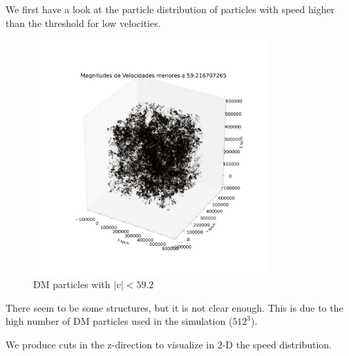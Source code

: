 \documentclass[12pt]{article}
\begin{document}
We first have a look at the particle distribution of particles with speed higher than the
threshold for low velocities.\\
\begin{figure}[ht]
\begin{center}
\includegraphics[width=0.8\textwidth]{graphs/pos_3d_vel_menor_s_smaller.png} %
\caption{DM particles with $|v| < 59.2 $}
\label{fg:3d_thresh_low}
\end{center}
\end{figure}
\FloatBarrier

There seem to be some structures, but it is not clear enough. This is due to the high number of DM particles used in the simulation ($512^3$). 


We produce cuts in the z-direction to visualize in 2-D the speed distribution. \\

\end{document}

